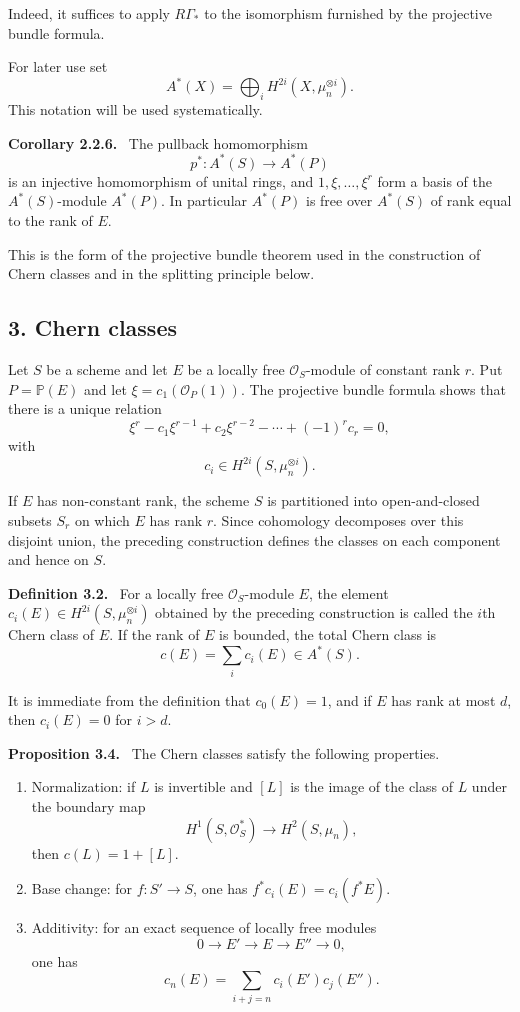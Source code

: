 \documentclass[14pt]{extarticle}
\newcommand{\cO}{\mathcal O}
\newenvironment{statement}[1]{\par\medskip\noindent\textbf{#1.}\ }{\par\medskip}
\begin{document}
Indeed, it suffices to apply $R\Gamma_*$ to the isomorphism furnished by the projective bundle formula.

For later use set
\[
   A^*(X)=\bigoplus_i H^{2i}(X,\mu_n^{\otimes i}).
\]
This notation will be used systematically.

\begin{statement}{Corollary 2.2.6}
The pullback homomorphism
\[
   p^*:A^*(S)\longrightarrow A^*(P)
\]
is an injective homomorphism of unital rings, and $1,\xi,\ldots,\xi^r$ form a basis of the $A^*(S)$-module $A^*(P)$. In particular $A^*(P)$ is free over $A^*(S)$ of rank equal to the rank of $E$.
\end{statement}

This is the form of the projective bundle theorem used in the construction of Chern classes and in the splitting principle below.

\subsection*{3. Chern classes}

Let $S$ be a scheme and let $E$ be a locally free $\cO_S$-module of constant rank $r$. Put $P=\mathbb P(E)$ and let $\xi=c_1(\cO_P(1))$. The projective bundle formula shows that there is a unique relation
\[
   \xi^r-c_1\xi^{r-1}+c_2\xi^{r-2}-\cdots+(-1)^r c_r=0,
\]
with
\[
   c_i\in H^{2i}(S,\mu_n^{\otimes i}).
\]

If $E$ has non-constant rank, the scheme $S$ is partitioned into open-and-closed subsets $S_r$ on which $E$ has rank $r$. Since cohomology decomposes over this disjoint union, the preceding construction defines the classes on each component and hence on $S$.

\begin{statement}{Definition 3.2}
For a locally free $\cO_S$-module $E$, the element $c_i(E)\in H^{2i}(S,\mu_n^{\otimes i})$ obtained by the preceding construction is called the $i$th Chern class of $E$. If the rank of $E$ is bounded, the total Chern class is
\[
   c(E)=\sum_i c_i(E)\in A^*(S).
\]
\end{statement}

It is immediate from the definition that $c_0(E)=1$, and if $E$ has rank at most $d$, then $c_i(E)=0$ for $i>d$.

\begin{statement}{Proposition 3.4}
The Chern classes satisfy the following properties.
\begin{enumerate}[label=(\roman*)]
\item Normalization: if $L$ is invertible and $[L]$ is the image of the class of $L$ under the boundary map
\[
   H^1(S,\cO_S^*)\to H^2(S,\mu_n),
\]
then $c(L)=1+[L]$.
\item Base change: for $f:S'\to S$, one has $f^*c_i(E)=c_i(f^*E)$.
\item Additivity: for an exact sequence of locally free modules
\[
   0\to E'\to E\to E''\to0,
\]
one has
\[
   c_n(E)=\sum_{i+j=n}c_i(E')c_j(E'').
\]
\end{enumerate}
\end{statement}
\end{document}
